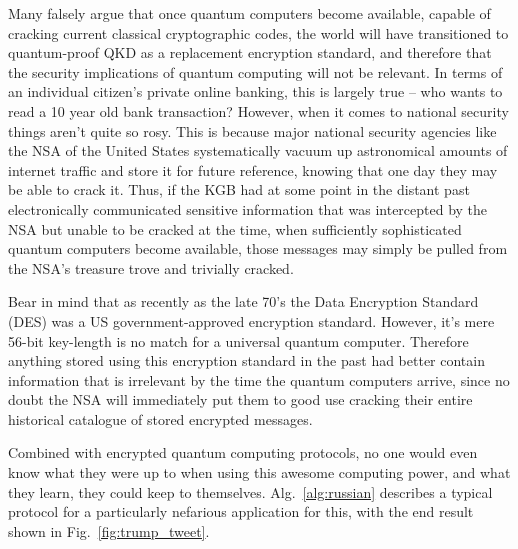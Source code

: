 Many falsely argue that once quantum computers become available, capable of cracking current classical cryptographic codes, the world will have transitioned to quantum-proof QKD as a replacement encryption standard, and therefore that the security implications of quantum computing will not be relevant. In terms of an individual citizen's private online banking, this is largely true -- who wants to read a 10 year old bank transaction? However, when it comes to national security things aren't quite so rosy. This is because major national security agencies like the NSA of the United States systematically vacuum up astronomical amounts of internet traffic and store it for future reference, knowing that one day they may be able to crack it. Thus, if the KGB had at some point in the distant past electronically communicated sensitive information that was intercepted by the NSA but unable to be cracked at the time, when sufficiently sophisticated quantum computers become available, those messages may simply be pulled from the NSA's treasure trove and trivially cracked.

Bear in mind that as recently as the late 70's the Data Encryption Standard (DES) was a US government-approved encryption standard. However, it's mere 56-bit key-length is no match for a universal quantum computer. Therefore anything stored using this encryption standard in the past had better contain information that is irrelevant by the time the quantum computers arrive, since no doubt the NSA will immediately put them to good use cracking their entire historical catalogue of stored encrypted messages.

Combined with encrypted quantum computing protocols, no one would even know what they were up to when using this awesome computing power, and what they learn, they could keep to themselves. Alg.~\ref{alg:russian} describes a typical protocol for a particularly nefarious application for this, with the end result shown in Fig.~\ref{fig:trump_tweet}.

